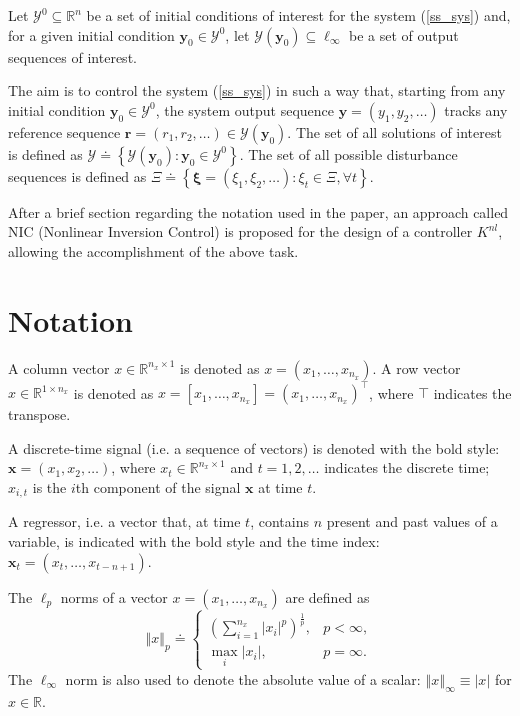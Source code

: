 \documentclass[twocolumn,english,journal]{IEEEtran}
\begin{document}
Let $\mathcal{Y}^{0}\subseteq\mathbb{R}^{n}$ be a set of initial
conditions of interest for the system (\ref{ss_sys}) and, for a given
initial condition $\boldsymbol{y}_{0}\in\mathcal{Y}^{0}$, let $\mathcal{Y}\left(\boldsymbol{y}_{0}\right)\subseteq\ell_{\infty}$
be a set of output sequences of interest.

The aim is to control the system (\ref{ss_sys}) in such a way that,
starting from any initial condition $\boldsymbol{y}_{0}\in\mathcal{Y}^{0}$,
the system output sequence $\boldsymbol{y}=(y_{1},y_{2},\ldots)$
tracks any reference sequence $\boldsymbol{r}=(r_{1},r_{2},\ldots)\in\mathcal{Y}\left(\boldsymbol{y}_{0}\right)$.
The set of all solutions of interest is defined as $\mathcal{Y}\doteq\left\{ \mathcal{Y}\left(\boldsymbol{y}_{0}\right):\boldsymbol{y}_{0}\in\mathcal{Y}^{0}\right\} $.
The set of all possible disturbance sequences is defined as $\varXi\doteq\left\{ \boldsymbol{\xi}=(\xi_{1},\xi_{2},\ldots):\xi_{t}\in\Xi,\forall t\right\} $.

After a brief section regarding the notation used in the paper, an
approach called NIC (Nonlinear Inversion Control) is proposed for
the design of a controller $K^{nl}$, allowing the accomplishment
of the above task.


\section{Notation}

A column vector $x\in\mathbb{R}^{n_{x}\times1}$ is denoted as $x=\left(x_{1},\ldots,x_{n_{x}}\right)$.
A row vector $x\in\mathbb{R}^{1\times n_{x}}$ is denoted as $x=\left[x_{1},\ldots,x_{n_{x}}\right]=\left(x_{1},\ldots,x_{n_{x}}\right)^{\top}$,
where $\top$ indicates the transpose.

A discrete-time signal (i.e. a sequence of vectors) is denoted with
the bold style: $\boldsymbol{x}=(x_{1},x_{2},\ldots)$, where $x_{t}\in\mathbb{R}^{n_{x}\times1}$
and $t=1,2,\ldots$ indicates the discrete time; $x_{i,t}$ is the
$i$th component of the signal $\boldsymbol{x}$ at time $t$.

A regressor, i.e. a vector that, at time $t$, contains $n$ present
and past values of a variable, is indicated with the bold style and
the time index: $\boldsymbol{x}_{t}=\left(x_{t},\ldots,x_{t-n+1}\right)$.

The $\ell_{p}$ norms of a vector $x=\left(x_{1},\ldots,x_{n_{x}}\right)$
are defined as
\[
\left\Vert x\right\Vert _{p}\doteq\begin{cases}
\left(\sum_{i=1}^{n_{x}}\left|x_{i}\right|^{p}\right)^{\frac{1}{p}}, & p<\infty,\\
\max_{i}\left|x_{i}\right|, & p=\infty.
\end{cases}
\]
The $\ell_{\infty}$ norm is also used to denote the absolute value
of a scalar: $\left\Vert x\right\Vert _{\infty}\equiv\left|x\right|$
for $x\in\mathbb{R}$. 
\end{document}
